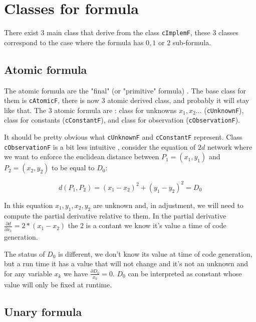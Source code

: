 \section{Classes for  formula}

There exist $3$ main class that derive from the class {\tt cImplemF}, these $3$ classes
correspond to the case where the formula has $0,1$ or $2$ sub-formula.

\subsection{Atomic formula}

The atomic formula are the "final" (or "primitive" formula) .  The base
class for them is {\tt cAtomicF}, there is now $3$ atomic derived class, and
probably it will stay like that. The $3$ atomic formula are : 
class for unknowns $x_1,x_2\dots$ ({\tt cUnknownF}), class for constants ({\tt cConstantF}),
and class for observation ({\tt cObservationF}).

It should be pretty obvious what {\tt cUnknownF}  and {\tt cConstantF} represent.
Class {\tt cObservationF} is a bit less intuitive , consider the equation of 
$2d$ network  where we want to enforce the euclidean distance between $P_1=(x_1,y_1)$ and $P_2=(x_2,y_2)$
to be equal to $D_0$:

\begin{equation}
   d(P_1,P_2) = (x_1-x_2)^2 + (y_1-y_2)^2 = D_0
\end{equation}

In this equation $x_1,y_1,x_2,y_2$ are unknown and, in adjustment, we will need to compute 
the partial derivative relative to them. In the partial derivative $\frac{\partial d}{\partial x_1} = 2*(x_1-x_2)$
the $2$ is a contant we know it's value a time of code generation.

The status of $D_0$ is different, we don't know its value at time of code generation, but a run time
it has a value that will not change and it's not an unknown and for any variable $x_k$  we have $\frac{\partial D_0}{x_k} =0$.
$D_0$ can be interpreted as constant whose value will only be fixed at runtime.



\subsection{Unary formula}
